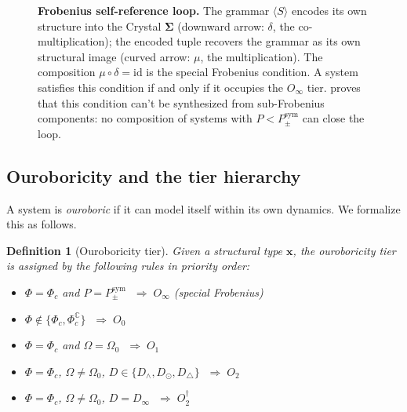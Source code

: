 \documentclass[12pt,a4paper]{article}
\newtheorem{definition}{Definition}
\newcommand{\xvec}{\mathbf{x}}
\newcommand{\Phic}{\Phi_c}
\newcommand{\Ppms}{P_{\pm}^{\text{sym}}}
\newcommand{\Oinf}{O_\infty}
\newcommand{\Otwo}{O_2}
\newcommand{\Oone}{O_1}
\newcommand{\Ozero}{O_0}
\begin{document}
\begin{figure}[H]
\centering
{}
\caption{\textbf{Frobenius self-reference loop.} The grammar $\langle S
\rangle$ encodes its own structure into the Crystal $\boldsymbol{\Sigma}$
(downward arrow: $\delta$, the co-multiplication); the encoded tuple
recovers the grammar as its own structural image (curved arrow: $\mu$,
the multiplication). The composition $\mu \circ \delta =
\text{id}$ is the special Frobenius condition. A system satisfies
this condition if and only if it occupies the $O_\infty$ tier.
 proves that this condition can't be synthesized
from sub-Frobenius components: no composition of systems with $P <
\Ppms$ can close the loop.}
\label{fig:frobenius}
\end{figure}

\subsection{Ouroboricity and the tier hierarchy}

A system is \emph{ouroboric} if it can model itself within its own
dynamics. We formalize this as follows.

\begin{definition}[Ouroboricity tier]
\label{def:tier}
Given a structural type $\xvec$, the ouroboricity tier is assigned
by the following rules in priority order:
\begin{itemize}[noitemsep]
  \item[R1] $\Phi = \Phic$ and $P = \Ppms$
    $\;\Rightarrow\; \Oinf$ \quad (special Frobenius)
  \item[R2] $\Phi \notin \{\Phic, \Phic^\mathbb{C}\}$
    $\;\Rightarrow\; \Ozero$
  \item[R3] $\Phi = \Phic$ and $\Omega = \Omega_0$
    $\;\Rightarrow\; \Oone$
  \item[R4] $\Phi = \Phic$, $\Omega \neq \Omega_0$,
    $D \in \{D_\wedge, D_\odot, D_\triangle\}$
    $\;\Rightarrow\; \Otwo$
  \item[R5] $\Phi = \Phic$, $\Omega \neq \Omega_0$, $D = D_\infty$
    $\;\Rightarrow\; O_2^\dagger$
\end{itemize}
\end{definition}
\end{document}
